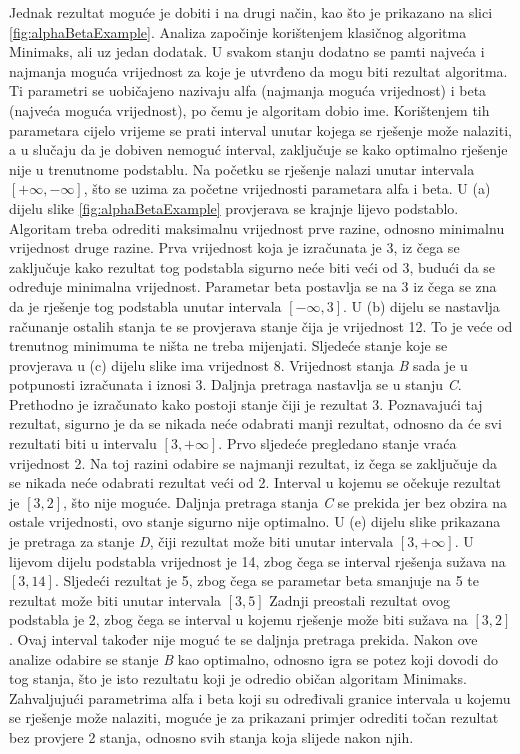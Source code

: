 \documentclass[times, utf8, seminar, numeric, tikz]{fer}
\begin{document}
Jednak rezultat moguće je dobiti i na drugi način, kao što je prikazano na slici \ref{fig:alphaBetaExample}. Analiza započinje korištenjem klasičnog algoritma Minimaks, ali uz jedan dodatak. U svakom stanju dodatno se pamti najveća i najmanja moguća vrijednost za koje je utvrđeno da mogu biti rezultat algoritma. Ti parametri se uobičajeno nazivaju alfa (najmanja moguća vrijednost) i beta (najveća moguća vrijednost), po čemu je algoritam dobio ime. Korištenjem tih parametara cijelo vrijeme se prati interval unutar kojega se rješenje može nalaziti, a u slučaju da je dobiven nemoguć interval, zaključuje se kako optimalno rješenje nije u trenutnome podstablu. Na početku se rješenje nalazi unutar intervala $[+\infty, -\infty]$, što se uzima za početne vrijednosti parametara alfa i beta. U (a) dijelu slike \ref{fig:alphaBetaExample} provjerava se krajnje lijevo podstablo. Algoritam treba odrediti maksimalnu vrijednost prve razine, odnosno minimalnu vrijednost druge razine. Prva vrijednost koja je izračunata je 3, iz čega se zaključuje kako rezultat tog podstabla sigurno neće biti veći od 3, budući da se određuje minimalna vrijednost. Parametar beta postavlja se na 3 iz čega se zna da je rješenje tog podstabla unutar intervala $[-\infty, 3]$. U (b) dijelu se nastavlja računanje ostalih stanja te se provjerava stanje čija je vrijednost 12. To je veće od trenutnog minimuma te ništa ne treba mijenjati. Sljedeće stanje koje se provjerava u (c) dijelu slike ima vrijednost 8. Vrijednost stanja \textit{B} sada je u potpunosti izračunata i iznosi 3. Daljnja pretraga nastavlja se u stanju \textit{C}. Prethodno je izračunato kako postoji stanje čiji je rezultat 3. Poznavajući taj rezultat, sigurno je da se nikada neće odabrati manji rezultat, odnosno da će svi rezultati biti u intervalu $[3, +\infty]$. Prvo sljedeće pregledano stanje vraća vrijednost 2. Na toj razini odabire se najmanji rezultat, iz čega se zaključuje da se nikada neće odabrati rezultat veći od 2. Interval u kojemu se očekuje rezultat je $[3, 2]$, što nije moguće. Daljnja pretraga stanja \textit{C} se prekida jer bez obzira na ostale vrijednosti, ovo stanje sigurno nije optimalno. U (e) dijelu slike prikazana je pretraga za stanje \textit{D}, čiji rezultat može biti unutar intervala $[3, +\infty]$. U lijevom dijelu podstabla vrijednost je 14, zbog čega se interval rješenja sužava na $[3, 14]$. Sljedeći rezultat je 5, zbog čega se parametar beta smanjuje na 5 te rezultat može biti unutar intervala $[3, 5]$ Zadnji preostali rezultat ovog podstabla je 2, zbog čega se interval u kojemu rješenje može biti sužava na $[3, 2]$. Ovaj interval također nije moguć te se daljnja pretraga prekida. Nakon ove analize odabire se stanje \textit{B} kao optimalno, odnosno igra se potez koji dovodi do tog stanja, što je isto rezultatu koji je odredio običan algoritam Minimaks. Zahvaljujući parametrima alfa i beta koji su određivali granice intervala u kojemu se rješenje može nalaziti, moguće je za prikazani primjer odrediti točan rezultat bez provjere 2 stanja, odnosno svih stanja koja slijede nakon njih.
\end{document}
